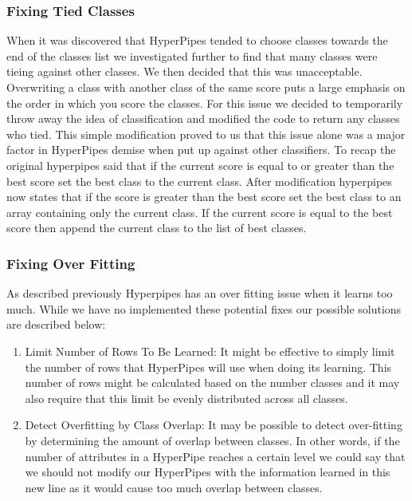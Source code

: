 \subsubsection{Fixing Tied Classes}
When it was discovered that HyperPipes tended to choose classes 
towards the end of the classes list we investigated further to 
find that many classes were tieing against other classes. We 
then decided that this was unacceptable. Overwriting a class 
with another class of the same score puts a large emphasis on 
the order in which you score the classes. For this issue we 
decided to temporarily throw away the idea of classification 
and modified the code to return any classes who tied. This 
simple modification proved to us that this issue alone was a 
major factor in HyperPipes demise when put up against other 
classifiers. To recap the original hyperpipes said that if 
the current score is equal to or greater than the best score 
set the best class to the current class. After modification 
hyperpipes now states that if the score is greater than the 
best score set the best class to an array containing only the 
current class. If the current score is equal to the best score 
then append the current class to the list of best classes.


\subsubsection{Fixing Over Fitting}
As described previously Hyperpipes has an over fitting issue 
when it learns too much. While we have no implemented these 
potential fixes our possible solutions are described below:
\begin{enumerate}
\item Limit Number of Rows To Be Learned: 
	It might be effective to simply limit the number of rows 
	that HyperPipes will use when doing its learning. This 
	number of rows might be calculated based on the number 
	classes and it may also require that this limit be 
	evenly distributed across all classes.
\item Detect Overfitting by Class Overlap:
	It may be possible to detect over-fitting by determining 
	the amount of overlap between classes. In other words, 
	if the number of attributes in a HyperPipe reaches a 
	certain level we could say that we should not modify our 
	HyperPipes with the information learned in this new line
	as it would cause too much overlap between classes.
\end{enumerate}


